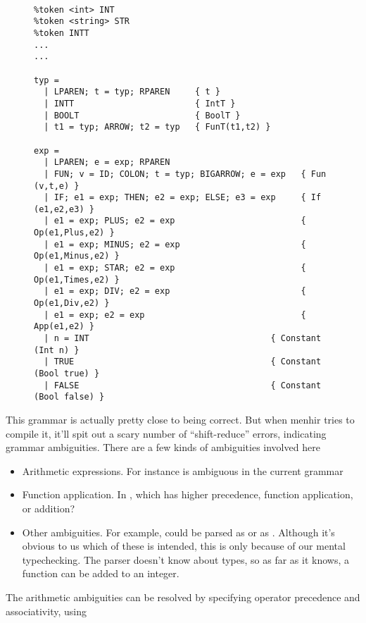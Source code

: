 \documentclass[pageno]{jpaper}
\begin{document}
{{\FloatBarrier
\begin{figure}
\begin{lstlisting}

%token <int> INT
%token <string> STR
%token INTT
...
...

typ =
  | LPAREN; t = typ; RPAREN     { t }
  | INTT                        { IntT }
  | BOOLT                       { BoolT }
  | t1 = typ; ARROW; t2 = typ   { FunT(t1,t2) }

exp =
  | LPAREN; e = exp; RPAREN
  | FUN; v = ID; COLON; t = typ; BIGARROW; e = exp   { Fun (v,t,e) }
  | IF; e1 = exp; THEN; e2 = exp; ELSE; e3 = exp     { If (e1,e2,e3) }
  | e1 = exp; PLUS; e2 = exp                         { Op(e1,Plus,e2) }
  | e1 = exp; MINUS; e2 = exp                        { Op(e1,Minus,e2) }
  | e1 = exp; STAR; e2 = exp                         { Op(e1,Times,e2) }
  | e1 = exp; DIV; e2 = exp                          { Op(e1,Div,e2) }
  | e1 = exp; e2 = exp                               { App(e1,e2) }
  | n = INT                                    { Constant (Int n) }
  | TRUE                                       { Constant (Bool true) }
  | FALSE                                      { Constant (Bool false) }

\end{lstlisting}
\end{figure}
\FloatBarrier

This grammar is actually pretty close to being correct. But when menhir tries to compile it, it'll spit out
a scary number of ``shift-reduce'' errors, indicating grammar ambiguities.
There are a few kinds of ambiguities involved here
\begin{itemize}
\item Arithmetic expressions. For instance  is ambiguous in the current grammar
\item Function application. In , which has higher precedence, function
      application, or addition?
\item Other ambiguities.  For example,  could be parsed as
       or as .  Although it's obvious to us
      which of these is intended, this is only because of our mental typechecking.  The parser doesn't know
      about types, so as far as it knows, a function can be added to an integer.
\end{itemize}
The arithmetic ambiguities
can be resolved by specifying operator precedence and associativity, using \lsti{%

}}}
\end{document}
